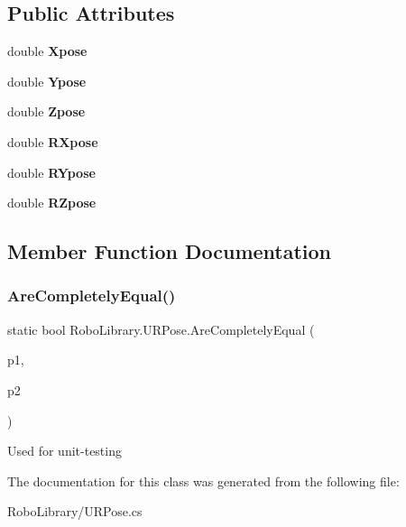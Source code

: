 \subsection*{Public Attributes}
\begin{DoxyCompactItemize}
\item 
\hypertarget{class_robo_library_1_1_u_r_pose_a00bad6e9326384073fd6015ada89e697}{}\label{class_robo_library_1_1_u_r_pose_a00bad6e9326384073fd6015ada89e697} 
double {\bfseries Xpose}
\item 
\hypertarget{class_robo_library_1_1_u_r_pose_a37f3fc6315d0d317476a450f921f5f94}{}\label{class_robo_library_1_1_u_r_pose_a37f3fc6315d0d317476a450f921f5f94} 
double {\bfseries Ypose}
\item 
\hypertarget{class_robo_library_1_1_u_r_pose_a5128b857bb17241abecf62e8b9af1188}{}\label{class_robo_library_1_1_u_r_pose_a5128b857bb17241abecf62e8b9af1188} 
double {\bfseries Zpose}
\item 
\hypertarget{class_robo_library_1_1_u_r_pose_a32a07da34f4efdbacdf71570f7f5c2b2}{}\label{class_robo_library_1_1_u_r_pose_a32a07da34f4efdbacdf71570f7f5c2b2} 
double {\bfseries R\+Xpose}
\item 
\hypertarget{class_robo_library_1_1_u_r_pose_a48877729488cf51b233c41578e09450f}{}\label{class_robo_library_1_1_u_r_pose_a48877729488cf51b233c41578e09450f} 
double {\bfseries R\+Ypose}
\item 
\hypertarget{class_robo_library_1_1_u_r_pose_a14d3f47d4760516d5157d606fb718e8b}{}\label{class_robo_library_1_1_u_r_pose_a14d3f47d4760516d5157d606fb718e8b} 
double {\bfseries R\+Zpose}
\end{DoxyCompactItemize}


\subsection{Member Function Documentation}
\hypertarget{class_robo_library_1_1_u_r_pose_a2300fa06e12149ca2f375fede40a8d9c}{}\label{class_robo_library_1_1_u_r_pose_a2300fa06e12149ca2f375fede40a8d9c} 
\subsubsection{\texorpdfstring{Are\+Completely\+Equal()}{AreCompletelyEqual()}}
{\footnotesize\ttfamily static bool Robo\+Library.\+U\+R\+Pose.\+Are\+Completely\+Equal (\begin{DoxyParamCaption}\item[{\hyperlink{class_robo_library_1_1_u_r_pose}{U\+R\+Pose}}]{p1,  }\item[{\hyperlink{class_robo_library_1_1_u_r_pose}{U\+R\+Pose}}]{p2 }\end{DoxyParamCaption})\hspace{0.3cm}{\ttfamily [static]}}



Used for unit-\/testing 



The documentation for this class was generated from the following file\+:\begin{DoxyCompactItemize}
\item 
Robo\+Library/U\+R\+Pose.\+cs\end{DoxyCompactItemize}

